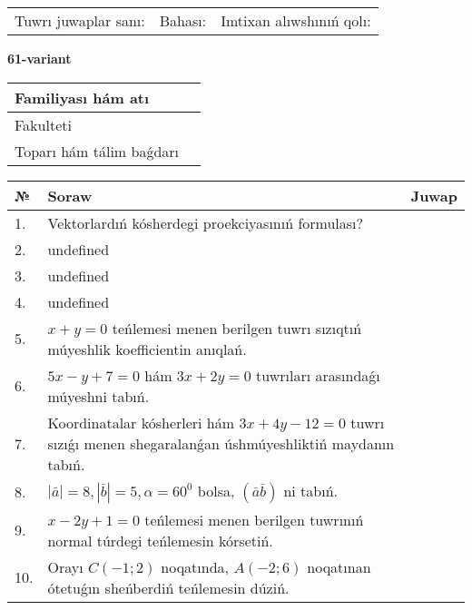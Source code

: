 \documentclass{article}
\begin{document}
\vspace{0.7cm}

\begin{tabular}{lll}
Tuwrı juwaplar sanı: \underline{\hspace{1cm}} & 
Bahası: \underline{\hspace{1cm}} & 
Imtixan alıwshınıń qolı: \underline{\hspace{2cm}} \\
\end{tabular}

\egroup

\newpage


\textbf{61-variant}\\

\bgroup
\def\arraystretch{1.6} %

\begin{tabular}{|m{5.7cm}|m{9.5cm}|}
\hline
Familiyası hám atı & \\
\hline
Fakulteti  & \\
\hline
Toparı hám tálim baǵdarı  & \\
\hline
\end{tabular}

\vspace{0.7cm}

\begin{tabular}{|m{0.7cm}|m{10cm}|m{4cm}|}
\hline
№ & Soraw & Juwap \\
\hline
1. & Vektorlardıń kósherdegi proekciyasınıń formulası? &  \\
\hline
2. & undefined &  \\
\hline
3. & undefined &  \\
\hline
4. & undefined &  \\
\hline
5. & \(x + y = 0\) teńlemesi menen berilgen tuwrı sızıqtıń múyeshlik koefficientin anıqlań. &  \\
\hline
6. & \(5 x - y + 7 = 0\) hám \(3 x + 2 y = 0\) tuwrıları arasındaǵı múyeshni tabıń. &  \\
\hline
7. & Koordinatalar kósherleri hám \( 3 x + 4 y - 12 = 0 \) tuwrı sızıǵı menen shegaralanǵan úshmúyeshliktiń maydanın tabıń. &  \\
\hline
8. & \(\left| \bar{a} \right| = 8, \left| \bar{b} \right| = 5, \alpha = 60^{0}\) bolsa, \(( \bar{a}\bar{b} )\) ni tabıń. &  \\
\hline
9. & \(x - 2 y + 1 = 0\) teńlemesi menen berilgen tuwrınıń normal túrdegi teńlemesin kórsetiń. &  \\
\hline
10. & Orayı \(C (- 1;2)\) noqatında, \(A (- 2;6 )\) noqatınan ótetuǵın sheńberdiń teńlemesin dúziń. & \\
\hline
\end{tabular}
\end{document}
